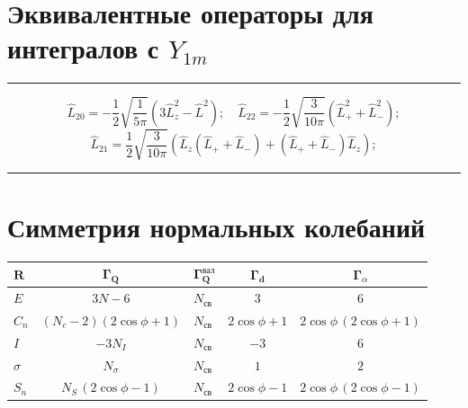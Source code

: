 \section{Эквивалентные операторы для интегралов с \texorpdfstring{$\textit{Y}_{1m}$}{|1 m>}}
\rule{\textwidth}{0.4pt}
\[ \widehat L_{20} = -\frac{1}{2}\sqrt{\frac{1}{5\pi}}\left(3\widehat L_z^2-\widehat L^2\right); \quad \widehat L_{22} =-\frac{1}{2}\sqrt{\frac{3}{10\pi}} \left( \widehat L_+^2 + \widehat L_-^2  \right);\]\hspace{\parindent}
\[ \widehat L_{21} = \frac{1}{2}\sqrt{\frac{3}{10\pi}}\left(\widehat L_z (\widehat L_+ + \widehat L_-)+(\widehat L_+ + \widehat L_-) \widehat L_z\right);\]
\rule{\textwidth}{0.4pt}


\section{Симметрия нормальных колебаний}
\vspace{0.4cm}

\begin{center}
\begin{tabular}{ |C{1cm}|c|C{1cm}|c|c| }
 \hline
 $\mathbf{R}$ & $\mathbf{\Gamma_Q}$  & $\mathbf{\Gamma_Q^{\text{вал}}}$ & $\mathbf{\Gamma_d}$ & $\mathbf{\Gamma}$\boldmath$_\alpha$\\[0.35ex]
 \hline\hline
 $E$ & $3N-6$ & $N_{\text{св}}$ & $3$ & $6$ \\[0.35ex]
 \hline
 $C_n$ & $(N_c-2)(2\cos \phi+1)$ & $N_{\text{св}}$ & $2\cos\phi+1$ & $2\cos\phi\,(2\cos\phi+1)$ \\[0.35ex]
 \hline
 $I$ & $-3N_I$ & $N_{\text{св}}$ & $-3$ & $6$ \\[0.35ex]
 \hline
 $\sigma$ & $N_\sigma$ & $N_{\text{св}}$ & $1$ & $2$ \\[0.35ex]
 \hline
 $S_n$ & $N_S\,(2\cos \phi-1)$ & $N_{\text{св}}$ &$2\cos\phi-1$ & $2\cos\phi\,(2\cos\phi-1)$ \\[0.35ex]
 \hline
\end{tabular}
\end{center}

